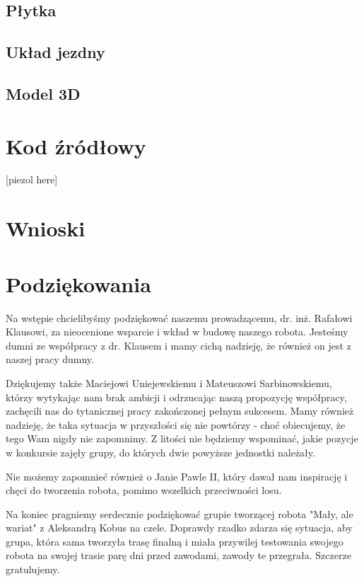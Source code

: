 \documentclass{article}
\begin{document}
\subsection{Płytka}


\subsection{Układ jezdny}


\subsection{Model 3D}

\section{Kod źródłowy}

[piezol here]

\section{Wnioski}

\section{Podziękowania}

Na wstępie chcielibyśmy podziękować naszemu prowadzącemu, dr. inż. Rafałowi Klausowi,  za nieocenione wsparcie i wkład w budowę naszego robota. Jesteśmy dumni ze współpracy z dr. Klausem i mamy cichą nadzieję, że również on jest z naszej pracy dumny.

Dziękujemy także Maciejowi Uniejewskiemu i Mateuszowi Sarbinowskiemu, którzy  wytykając nam brak ambicji i odrzucając naszą propozycję współpracy, zachęcili nas do tytanicznej pracy zakończonej pełnym sukcesem. Mamy również nadzieję, że taka sytuacja w przyszłości się nie powtórzy - choć obiecujemy, że tego Wam nigdy nie zapomnimy. Z litości nie będziemy wspominać, jakie pozycje w konkursie zajęły grupy, do których dwie powyższe jednostki należały.

Nie możemy zapomnieć również o Janie Pawle II, który dawał nam inspirację i chęci do tworzenia robota, pomimo wszelkich przeciwności losu.

Na koniec pragniemy serdecznie podziękować grupie tworzącej robota "Mały, ale wariat" z Aleksandrą Kobus na czele. Doprawdy rzadko zdarza się sytuacja, aby grupa, która sama tworzyła trasę finalną i miała przywilej testowania swojego robota na swojej trasie parę dni przed zawodami, zawody te przegrała. Szczerze gratulujemy.
\end{document}
